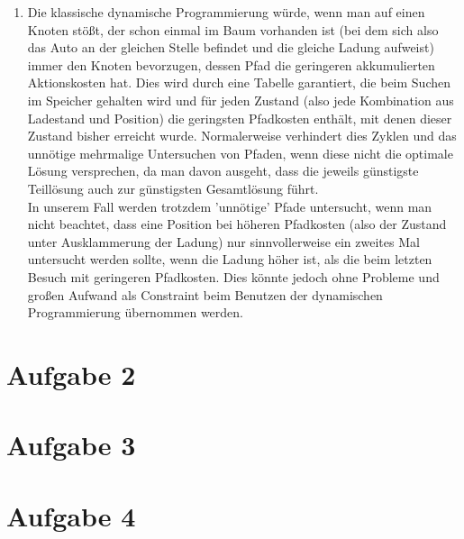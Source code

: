 \documentclass[a4paper,10pt]{article}
\begin{document}
\begin{enumerate}[~~a)]
	\item 
	Die klassische dynamische Programmierung würde, wenn man auf einen Knoten stößt, der schon einmal im Baum vorhanden ist (bei dem sich also das Auto an der gleichen Stelle befindet und die gleiche Ladung aufweist) immer den Knoten bevorzugen, dessen Pfad die geringeren akkumulierten Aktionskosten hat. Dies wird durch eine Tabelle garantiert, die beim Suchen im Speicher gehalten wird und für jeden Zustand (also jede Kombination aus Ladestand und Position) die geringsten Pfadkosten enthält, mit denen dieser Zustand bisher erreicht wurde. Normalerweise verhindert dies Zyklen und das unnötige mehrmalige Untersuchen von Pfaden, wenn diese nicht die optimale Lösung versprechen, da man davon ausgeht, dass die jeweils günstigste Teillösung auch zur günstigsten Gesamtlösung führt. \\
	In unserem Fall werden trotzdem 'unnötige' Pfade untersucht, wenn man nicht beachtet, dass eine Position bei höheren Pfadkosten (also der Zustand unter Ausklammerung der Ladung) nur sinnvollerweise ein zweites Mal untersucht werden sollte, wenn die Ladung höher ist, als die beim letzten Besuch mit geringeren Pfadkosten. Dies könnte jedoch ohne Probleme und großen Aufwand als Constraint beim Benutzen der dynamischen Programmierung übernommen werden.
\end{enumerate}

\section*{Aufgabe 2}

\section*{Aufgabe 3}

\section*{Aufgabe 4}
\end{document}
